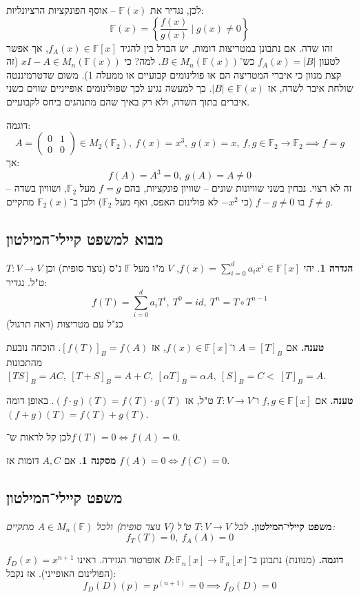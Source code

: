 \documentclass[a4paper]{article}
\newcommand\F         {\mathbb{F}}
\newcommand\co        {\colon}
\newcommand\pms[1]    {\begin{pmatrix}
		#1
\end{pmatrix}}
\newcommand\ag        {\alpha}
\newcommand\ccb[1]    {\left \{ #1 \right \}}
\theoremstyle{definition}
\newtheorem{definition}{הגדרה}
\newtheorem{Collary}{מסקנה}
\newcommand\cola [1] {\begin{Collary}#1\end{Collary}}
\newcommand\defi  [1] {\begin{definition}#1\end{definition}}
\begin{document}
	לכן, נגדיר את $\F(x)$ – אוסף הפונקציות הרציונליות: 
	\[ \F(x) = \ccb{\frac{f(x)}{g(x)} \mid g(x) \neq 0} \]
	זהו שדה. אם נתבונן במטריצות דומות, יש הבדל בין להגיד $f_A(x) \in \F[x]$, אך אפשר לטעון $f_A(x) = |B|$ כש־$B \in M_n(\F(x))$. למה? כי $xI - A \in M_n(\F(x))$ (זה קצת מנוון כי איברי המטריצה הם או פולינומים קבועיים או ממעלה 1). משום שדטרמיננטה שולחת איבר לשדה, אז $|B| \in \F(x)$. כך למעשה נגיע לכך שפולינומים אופייניים שווים כשני איברים בתוך השדה, ולא רק באיך שהם מתנהגים ביחס לקבועיים. 
	
	דוגמה: 
	\[ A = \pms{0 & 1 \\ 0 & 0} \in M_2(\F_2), \ f(x) = x^3, \ g(x) = x, \ f, g \in \F_2 \to \F_2 \implies f = g \]
	אך: 
	\[ f(A) = A^3 = 0, \ g(A) = A \neq 0 \]
	זה לא רצוי. נבחין בשני שוויונות שונים – שוויון פונקציות, בהם $f = g$ מעל $\F_2$, ושוויון בשדה – בו $f -g \neq 0$ (כי $-x^2$ לא פולינום האפס, ואף מעל $\F_2$) ולכן ב־$\F_2(x)$ מתקיים $f \neq g$. 
	
	
	\subsection{מבוא למשפט קיילי־המילטון}
	
	\defi{יהי $f(x) = \sum_{i = 0}^{d}a_ix^i \in \F[x]$, $V$ מ"ו מעל $\F$ נ"ס (נוצר סופית) וכן $T \co V \to V$ ט"ל. נגדיר: 
		\[ f(T) = \sum_{i = 0}^{d}a_iT^{i}, \ T^0 = id, \ T^{n} = T \circ T^{n - 1} \]
	כנ"ל עם מטריצות (ראה תרגול)
	}

	
	\textbf{טענה. }אם $A = [T]_B$ ו־$f(x) \in \F[x]$, אז $[f(T)]_B = f(A)$. הוכחה נובעת מהתכונות $[TS]_B = AC, \ [T + S]_B = A + C, \ [\ag T]_B = \ag A, \ [S]_B = C<\ [T]_B = A$. 
	
	\textbf{טענה. }אם $f, g \in \F[x]$ ו־$T \co V \to V$ ט"ל, אז $(f \cdot g)(T) = f(T) \cdot g(T)$. באופן דומה $(f + g)(T) = f(T) + g(T)$. 
	
	לכן קל לראות ש־$f(T) = 0 \iff f(A) = 0$. 
	
	\cola{אם $A, C$ דומות אז $f(A) = 0 \iff f(C) = 0$. }
	
	\subsection{משפט קיילי־המילטון}
	\textbf{משפט קיילי־המילטון. }\textit{לכל $T\co V \to V$ ט"ל ($V$ נוצר סופית) ולכל $A \in M_n(\F)$ מתקיים: 
		\[ f_T(T) = 0, \ f_A(A) = 0 \]}
	
	\textbf{דוגמה. }(מנוונת) נתבונן ב־$D \co \F_n[x] \to \F_n[x]$ אופרטור הגזירה. ראינו $f_D(x) = x^{n + 1}$ (הפולינום האופייני). אז נקבל: 
	\[ f_D(D)(p) = p^{(n + 1)} = 0 \implies f_D(D) = 0 \]
	
\end{document}
